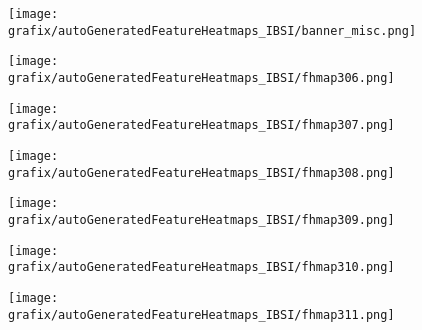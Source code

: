 \begin{subfigure}{\wid\textwidth} 
    \texttt{[image: grafix/autoGeneratedFeatureHeatmaps\_IBSI/banner\_misc.png]} 
\end{subfigure} 
\hspace{\hsp} 
\begin{subfigure}{\wid\textwidth} 
    \centering 
    \caption{\tiny \sffamily {}} 
    \vspace{\vsp} 
    \texttt{[image: grafix/autoGeneratedFeatureHeatmaps\_IBSI/fhmap306.png]} 
\end{subfigure} 
\hspace{\hsp} 
\begin{subfigure}{\wid\textwidth} 
    \centering 
    \caption{\tiny \sffamily {}} 
    \vspace{\vsp} 
    \texttt{[image: grafix/autoGeneratedFeatureHeatmaps\_IBSI/fhmap307.png]} 
\end{subfigure} 
\hspace{\hsp} 
\begin{subfigure}{\wid\textwidth} 
    \centering 
    \caption{\tiny \sffamily {}} 
    \vspace{\vsp} 
    \texttt{[image: grafix/autoGeneratedFeatureHeatmaps\_IBSI/fhmap308.png]} 
\end{subfigure} 
\hspace{\hsp} 
\begin{subfigure}{\wid\textwidth} 
    \centering 
    \caption{\tiny \sffamily {}} 
    \vspace{\vsp} 
    \texttt{[image: grafix/autoGeneratedFeatureHeatmaps\_IBSI/fhmap309.png]} 
\end{subfigure} 
\hspace{\hsp} 
\begin{subfigure}{\wid\textwidth} 
    \centering 
    \caption{\tiny \sffamily {}} 
    \vspace{\vsp} 
    \texttt{[image: grafix/autoGeneratedFeatureHeatmaps\_IBSI/fhmap310.png]} 
\end{subfigure} 
\hspace{\hsp} 
\begin{subfigure}{\wid\textwidth} 
    \centering 
    \caption{\tiny \sffamily {}} 
    \vspace{\vsp} 
    \texttt{[image: grafix/autoGeneratedFeatureHeatmaps\_IBSI/fhmap311.png]} 
\end{subfigure} 
